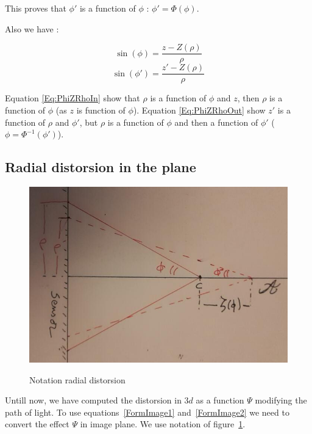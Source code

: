 This proves that $\phi'$ is a function of $\phi$ :  $\phi' = \Phi(\phi)$.

Also we have  :


\begin{equation}
	\sin(\phi) = \frac {z-Z(\rho) }{\rho}
	\label{Eq:PhiZRhoIn}
\end{equation}
\begin{equation}
	\sin(\phi') = \frac {z'-Z(\rho) }{\rho}
	\label{Eq:PhiZRhoOut}
\end{equation}

Equation \ref{Eq:PhiZRhoIn} show that $\rho$ is a function of $\phi$  and $z$, then $\rho$ is a function of $\phi$ (as $z$ is function of $\phi$).
Equation \ref{Eq:PhiZRhoOut} show $z'$ is a function of $\rho$ and $\phi'$, but $\rho$ is a function of  $\phi$ and
then a function of $\phi'$  ($\phi = \Phi^{-1}(\phi')$).



\subsection{Radial distorsion in the plane}

\begin{figure}
\centering
	\includegraphics[width=12cm]{Methods/Images/RadialInThePlane.jpg} \\
	\caption{Notation radial distorsion}
	\label{fig:RadInPlane}
\end{figure}

Untill now, we have computed the distorsion in $3d$ as a function $\Psi$ modifying the path of light. To use 
equations~\ref{FormImage1} and~\ref{FormImage2} we need to convert the effect $\Psi$  in image plane.
We use notation of figure~\ref{fig:RadInPlane}.


